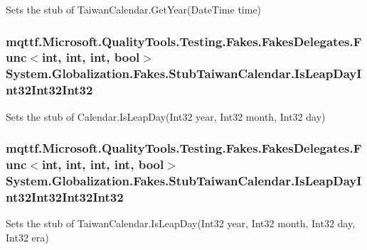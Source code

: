 Sets the stub of Taiwan\-Calendar.\-Get\-Year(\-Date\-Time time)

\hypertarget{class_system_1_1_globalization_1_1_fakes_1_1_stub_taiwan_calendar_a2503b6a550b665466f378cca685c0608}{
\subsubsection[{Is\-Leap\-Day\-Int32\-Int32\-Int32}]{\setlength{\rightskip}{0pt plus 5cm}mqttf.\-Microsoft.\-Quality\-Tools.\-Testing.\-Fakes.\-Fakes\-Delegates.\-Func$<$int, int, int, bool$>$ System.\-Globalization.\-Fakes.\-Stub\-Taiwan\-Calendar.\-Is\-Leap\-Day\-Int32\-Int32\-Int32}}\label{class_system_1_1_globalization_1_1_fakes_1_1_stub_taiwan_calendar_a2503b6a550b665466f378cca685c0608}


Sets the stub of Calendar.\-Is\-Leap\-Day(\-Int32 year, Int32 month, Int32 day)

\hypertarget{class_system_1_1_globalization_1_1_fakes_1_1_stub_taiwan_calendar_a7687188f61ae2edc3ca07e98f68ab124}{
\subsubsection[{Is\-Leap\-Day\-Int32\-Int32\-Int32\-Int32}]{\setlength{\rightskip}{0pt plus 5cm}mqttf.\-Microsoft.\-Quality\-Tools.\-Testing.\-Fakes.\-Fakes\-Delegates.\-Func$<$int, int, int, int, bool$>$ System.\-Globalization.\-Fakes.\-Stub\-Taiwan\-Calendar.\-Is\-Leap\-Day\-Int32\-Int32\-Int32\-Int32}}\label{class_system_1_1_globalization_1_1_fakes_1_1_stub_taiwan_calendar_a7687188f61ae2edc3ca07e98f68ab124}


Sets the stub of Taiwan\-Calendar.\-Is\-Leap\-Day(\-Int32 year, Int32 month, Int32 day, Int32 era)

